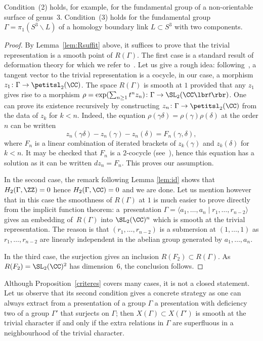 Condition~(2) holds, for example, for the fundamental group of a
non-orientable surface of genus~3.
Condition~(3) holds for the fundamental group
$\Gamma=\pi_1(S^3\smallsetminus L)$ of a homology boundary link
$L\subset S^3$ with two components.

\begin{proof}
By Lemma~\ref{lem:Rsuffit} above, it suffices to prove that the trivial
representation is a smooth point of $R(\Gamma)$. The first case is a
standard result of deformation theory for which we refer
to~\cite{NijenhuisRichardson}. Let us give a rough idea:
following~\cite{Weil}, a tangent vector to the trivial representation is
a cocycle, in our case, a morphism $z_1\colon\Gamma\to \petitsl_2(\CC)$.
The space $R(\Gamma)$ is smooth at $1$ provided that any $z_1$ gives rise
to a morphism
$\rho=\exp(\sum_{n\geq 1} t^n z_n)\colon\Gamma\to \SL_2(\CC\lbr t\rbr)$.
One can prove its existence recursively by constructing
$z_n\colon\Gamma\to\petitsl_2(\CC)$ from the data of $z_k$ for $k<n$.
Indeed, the equation $\rho(\gamma\delta)=\rho(\gamma)\rho(\delta)$ at
the order $n$ can be written
\[ z_n(\gamma\delta)-z_n(\gamma)-z_n(\delta)=F_n(\gamma,\delta), \]
where $F_n$ is a linear combination of iterated brackets of $z_k(\gamma)$
and $z_k(\delta)$ for $k<n$. It may be checked that $F_n$ is a $2$-cocycle
(see~\cite{NijenhuisRichardson}), hence this equation has a solution as it
can be written $dz_n=F_n$. This proves our assumption.

In the second case, the remark following Lemma \ref{lem:id}
shows that $H_2(\Gamma,\ZZ)=0$ hence
$H_2(\Gamma,\CC)=0$ and we are done. Let us mention however that in this case
the smoothness of $R(\Gamma)$ at $1$ is much easier to prove directly from
the implicit function theorem: a~presentation
$\Gamma=\langle a_1,\ldots,a_n\mid r_1,\ldots,r_{n-2}\rangle$
gives an embedding of~$R(\Gamma)$ into $\SL_2(\CC)^n$ which
is smooth at the trivial representation. The reason is that
$(r_1,\ldots,r_{n-2})$ is a submersion at
$(1,\ldots,1)$ as $r_1,\ldots,r_{n-2}$ are linearly independent
in the abelian group generated by $a_1,\ldots,a_n$.

In the third case, the surjection gives an inclusion
$R(F_2)\subset R(\Gamma)$. As $R(F_2)=\SL_2(\CC)^2$ has dimension~6, the
conclusion follows.
\end{proof}

Although Proposition~\ref{criteres} covers many cases, it is not a closed
statement. Let us observe that its second condition gives a concrete
strategy as one can always extract from a presentation of a group $\Gamma$
a presentation with deficiency two of a group $\Gamma'$ that surjects on
$\Gamma$; then $X(\Gamma)\subset X(\Gamma')$ is smooth at the trivial
character if and only if the extra relations in $\Gamma$ are superfluous in
a neighbourhood of the trivial character.

